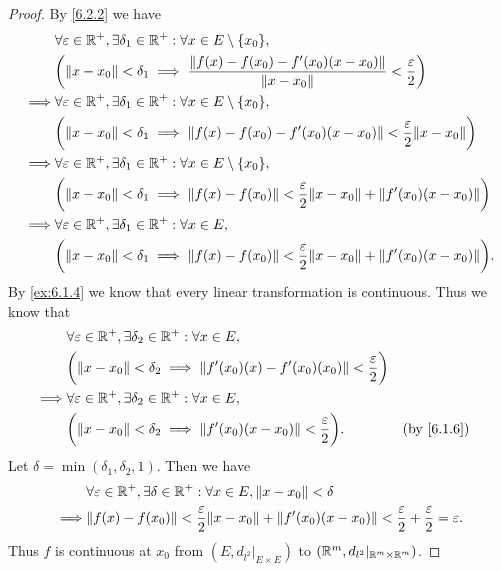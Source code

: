 \begin{proof}
  By \cref{6.2.2} we have
  \begin{align*}
             & \forall \varepsilon \in \R^+, \exists \delta_1 \in \R^+ : \forall x \in E \setminus \{x_0\},                                               \\
             & \bigg(\norm*{x - x_0} < \delta_1 \implies \dfrac{\norm*{f(x) - f(x_0) - f'(x_0)(x - x_0)}}{\norm*{x - x_0}} < \dfrac{\varepsilon}{2}\bigg) \\
    \implies & \forall \varepsilon \in \R^+, \exists \delta_1 \in \R^+ : \forall x \in E \setminus \{x_0\},                                               \\
             & \bigg(\norm*{x - x_0} < \delta_1 \implies \norm*{f(x) - f(x_0) - f'(x_0)(x - x_0)} < \dfrac{\varepsilon}{2} \norm*{x - x_0}\bigg)          \\
    \implies & \forall \varepsilon \in \R^+, \exists \delta_1 \in \R^+ : \forall x \in E \setminus \{x_0\},                                               \\
             & \bigg(\norm*{x - x_0} < \delta_1 \implies \norm*{f(x) - f(x_0)} < \dfrac{\varepsilon}{2} \norm*{x - x_0} + \norm*{f'(x_0)(x - x_0)}\bigg)  \\
    \implies & \forall \varepsilon \in \R^+, \exists \delta_1 \in \R^+ : \forall x \in E,                                                                 \\
             & \bigg(\norm*{x - x_0} < \delta_1 \implies \norm*{f(x) - f(x_0)} < \dfrac{\varepsilon}{2} \norm*{x - x_0} + \norm*{f'(x_0)(x - x_0)}\bigg).
  \end{align*}
  By \cref{ex:6.1.4} we know that every linear transformation is continuous.
  Thus we know that
  \begin{align*}
             & \forall \varepsilon \in \R^+, \exists \delta_2 \in \R^+ : \forall x \in E,                                                 \\
             & \bigg(\norm*{x - x_0} < \delta_2 \implies \norm*{f'(x_0)(x) - f'(x_0)(x_0)} < \dfrac{\varepsilon}{2}\bigg)                 \\
    \implies & \forall \varepsilon \in \R^+, \exists \delta_2 \in \R^+ : \forall x \in E,                                                 \\
             & \bigg(\norm*{x - x_0} < \delta_2 \implies \norm*{f'(x_0)(x - x_0)} < \dfrac{\varepsilon}{2}\bigg).         &  & \by{6.1.6}
  \end{align*}
  Let \(\delta = \min(\delta_1, \delta_2, 1)\).
  Then we have
  \begin{align*}
             & \forall \varepsilon \in \R^+, \exists \delta \in \R^+ : \forall x \in E, \norm*{x - x_0} < \delta                                                          \\
    \implies & \norm*{f(x) - f(x_0)} < \dfrac{\varepsilon}{2} \norm*{x - x_0} + \norm*{f'(x_0)(x - x_0)} < \dfrac{\varepsilon}{2} + \dfrac{\varepsilon}{2} = \varepsilon.
  \end{align*}
  Thus \(f\) is continuous at \(x_0\) from \((E, d_{l^2}|_{E \times E})\) to \((\mathbb{R}^m, d_{l^2}|_{\mathbb{R}^m \times \mathbb{R}^m})\).
\end{proof}


